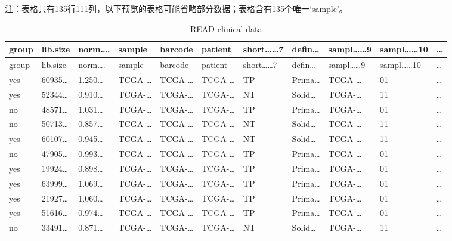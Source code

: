 \documentclass[
]{article}
\begin{document}
\begin{center}\begin{tcolorbox}[colback=gray!10, colframe=gray!50, width=0.9\linewidth, arc=1mm, boxrule=0.5pt]注：表格共有135行111列，以下预览的表格可能省略部分数据；表格含有135个唯一`sample'。
\end{tcolorbox}
\end{center}

\begin{longtable}[]{@{}lllllllllll@{}}
\caption{\label{tab:READ-clinical-data}READ clinical data}\tabularnewline
\toprule
group & lib.size & norm\ldots. & sample & barcode & patient & short\ldots\ldots7 & defin\ldots{} & sampl\ldots\ldots9 & sampl\ldots\ldots10 & \ldots{}\tabularnewline
\midrule
\endfirsthead
\toprule
group & lib.size & norm\ldots. & sample & barcode & patient & short\ldots\ldots7 & defin\ldots{} & sampl\ldots\ldots9 & sampl\ldots\ldots10 & \ldots{}\tabularnewline
\midrule
\endhead
yes & 60935\ldots{} & 1.250\ldots{} & TCGA-\ldots{} & TCGA-\ldots{} & TCGA-\ldots{} & TP & Prima\ldots{} & TCGA-\ldots{} & 01 & \ldots{}\tabularnewline
yes & 52344\ldots{} & 0.910\ldots{} & TCGA-\ldots{} & TCGA-\ldots{} & TCGA-\ldots{} & NT & Solid\ldots{} & TCGA-\ldots{} & 11 & \ldots{}\tabularnewline
no & 48571\ldots{} & 1.031\ldots{} & TCGA-\ldots{} & TCGA-\ldots{} & TCGA-\ldots{} & TP & Prima\ldots{} & TCGA-\ldots{} & 01 & \ldots{}\tabularnewline
no & 50713\ldots{} & 0.857\ldots{} & TCGA-\ldots{} & TCGA-\ldots{} & TCGA-\ldots{} & NT & Solid\ldots{} & TCGA-\ldots{} & 11 & \ldots{}\tabularnewline
yes & 60107\ldots{} & 0.945\ldots{} & TCGA-\ldots{} & TCGA-\ldots{} & TCGA-\ldots{} & NT & Solid\ldots{} & TCGA-\ldots{} & 11 & \ldots{}\tabularnewline
no & 47905\ldots{} & 0.993\ldots{} & TCGA-\ldots{} & TCGA-\ldots{} & TCGA-\ldots{} & TP & Prima\ldots{} & TCGA-\ldots{} & 01 & \ldots{}\tabularnewline
yes & 19924\ldots{} & 0.898\ldots{} & TCGA-\ldots{} & TCGA-\ldots{} & TCGA-\ldots{} & TP & Prima\ldots{} & TCGA-\ldots{} & 01 & \ldots{}\tabularnewline
yes & 63999\ldots{} & 1.069\ldots{} & TCGA-\ldots{} & TCGA-\ldots{} & TCGA-\ldots{} & TP & Prima\ldots{} & TCGA-\ldots{} & 01 & \ldots{}\tabularnewline
yes & 21927\ldots{} & 1.060\ldots{} & TCGA-\ldots{} & TCGA-\ldots{} & TCGA-\ldots{} & TP & Prima\ldots{} & TCGA-\ldots{} & 01 & \ldots{}\tabularnewline
yes & 51616\ldots{} & 0.974\ldots{} & TCGA-\ldots{} & TCGA-\ldots{} & TCGA-\ldots{} & TP & Prima\ldots{} & TCGA-\ldots{} & 01 & \ldots{}\tabularnewline
no & 33491\ldots{} & 0.871\ldots{} & TCGA-\ldots{} & TCGA-\ldots{} & TCGA-\ldots{} & NT & Solid\ldots{} & TCGA-\ldots{} & 11 & \ldots{}\tabularnewline

\end{longtable}
\end{document}
